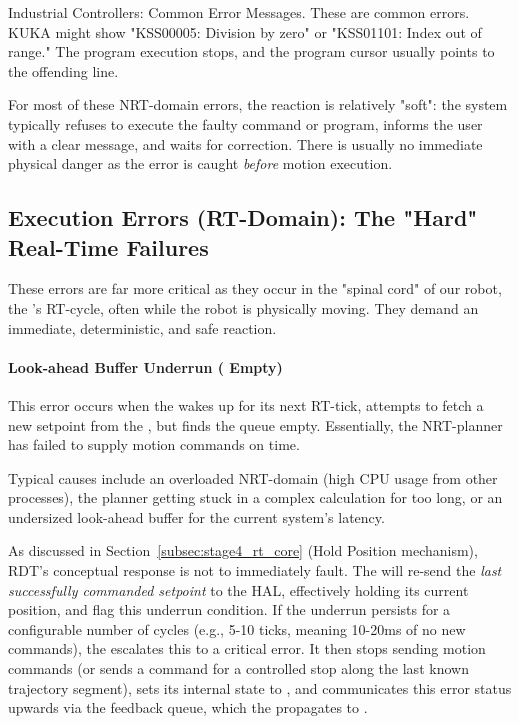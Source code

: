 \begin{principlebox}{Industrial Controllers: Common Error Messages.}
    These are common errors. KUKA might show "KSS00005: Division by zero" or "KSS01101: Index out of range." The program execution stops, and the program cursor usually points to the offending line.
\end{principlebox}


For most of these NRT-domain errors, the reaction is relatively "soft": the system typically refuses to execute the faulty command or program, informs the user with a clear message, and waits for correction. There is usually no immediate physical danger as the error is caught \textit{before} motion execution.

\subsection{Execution Errors (RT-Domain): The "Hard" Real-Time Failures}
\label{subsec:rt-domain-errors}

These errors are far more critical as they occur in the "spinal cord" of our robot, the 's RT-cycle, often while the robot is physically moving. They demand an immediate, deterministic, and safe reaction.

\paragraph{Look-ahead Buffer Underrun ( Empty)}
This error occurs when the  wakes up for its next RT-tick, attempts to fetch a new setpoint from the , but finds the queue empty. Essentially, the NRT-planner has failed to supply motion commands on time.

Typical causes include an overloaded NRT-domain (high CPU usage from other processes), the planner getting stuck in a complex calculation for too long, or an undersized look-ahead buffer for the current system's latency.

As discussed in Section~\ref{subsec:stage4_rt_core} (Hold Position mechanism), RDT's conceptual response is not to immediately fault. The  will re-send the \textit{last successfully commanded setpoint} to the HAL, effectively holding its current position, and flag this underrun condition. If the underrun persists for a configurable number of cycles (e.g., 5-10 ticks, meaning 10-20ms of no new commands), the  escalates this to a critical error. It then stops sending motion commands (or sends a command for a controlled stop along the last known trajectory segment), sets its internal state to , and communicates this error status upwards via the feedback queue, which the  propagates to .

